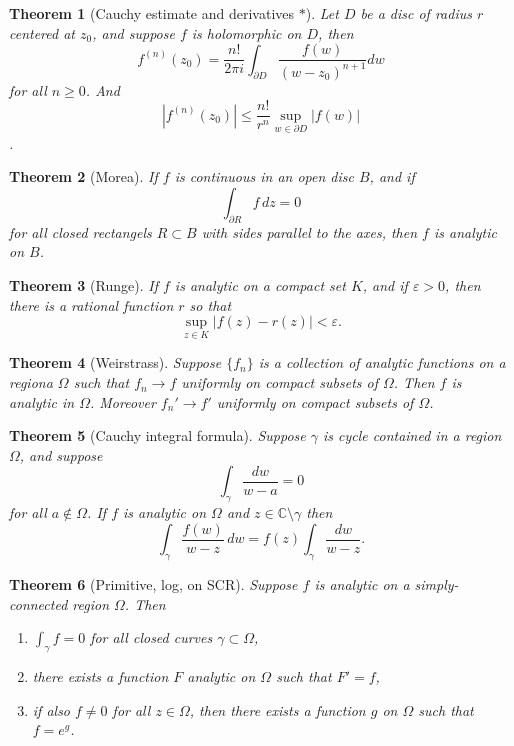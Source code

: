 \documentclass[12pt]{article}
\newtheorem{sats}{Theorem}
\theoremstyle{definition}
\newcommand{\eps}{\varepsilon}    %
\newcommand{\C}{\mathbb{C}}    %
\begin{document}
\begin{sats}[Cauchy estimate and derivatives $*$]
    Let $D$ be a disc of radius $r$ centered at $z_0$, and suppose $f$ is holomorphic on $D$, then $$f^{(n)}(z_0)=\frac{n!}{2\pi i}\int_{\partial D} \frac{f(w)}{(w-z_0)^{n+1}}dw$$ for all $n\geq 0$. And $$|f^{(n)}(z_0)|\leq\frac{n!}{r^n}\sup_{w\in\partial D} |f(w)|$$.
\end{sats}

\begin{sats}[Morea]
    If $f$ is continuous in an open disc $B$, and if $$\int_{\partial R} f \, dz=0$$ for all closed rectangels $R\subset B$ with sides parallel to the axes, then $f$ is analytic on $B$. 
\end{sats}

\begin{sats}[Runge]
    If $f$ is analytic on a compact set $K$, and if $\eps>0$, then there is a rational function $r$ so that 
    \begin{equation*}
        \sup_{z\in K}|f(z)-r(z)|<\eps.
    \end{equation*}
\end{sats}

\begin{sats}[Weirstrass]
    Suppose $\{f_n\}$ is a collection of analytic functions on a regiona $\Omega$ such that $f_n\to f$ uniformly on compact subsets of $\Omega$. Then $f$ is analytic in $\Omega$. Moreover $f_n'\to f'$ uniformly on compact subsets of $\Omega$.
\end{sats}

\begin{sats}[Cauchy integral formula]
    Suppose $\gamma$ is cycle contained in a region $\Omega$, and suppose $$\int_\gamma \frac{dw}{w-a}=0$$ for all $a\notin\Omega$. If $f$ is analytic on $\Omega$ and $z\in \C\setminus\gamma$ then $$\int_\gamma \frac{f(w)}{w-z}\,dw=f(z)\int_\gamma \frac{dw}{w-z}.$$
\end{sats}

\begin{sats}[Primitive, log, on SCR]
    Suppose $f$ is analytic on a simply-connected region $\Omega$. Then 
    \begin{enumerate}[label=(\roman*)]
        \item $\int_\gamma f = 0$ for all closed curves $\gamma\subset\Omega$,
        \item there exists a function $F$ analytic on $\Omega$ such that $F'=f$,
        \item if also $f\neq 0$ for all $z\in\Omega$, then there exists a function $g$ on $\Omega$ such that $f=e^g$.
    \end{enumerate}
\end{sats}
\end{document}
